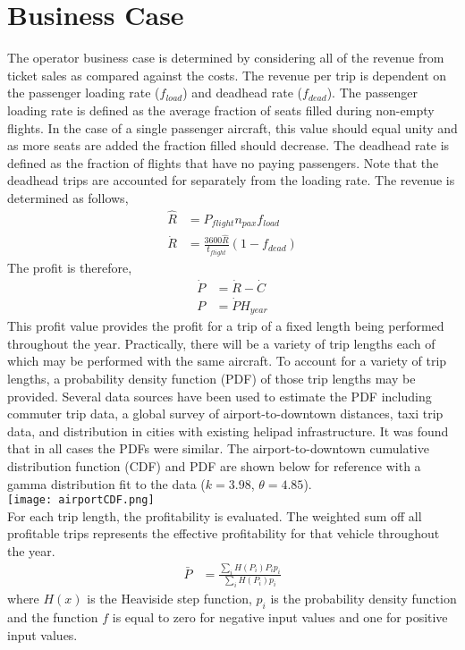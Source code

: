 \documentclass[12pt, letter]{article}
\begin{document}
\section{Business Case}
The operator business case is determined by considering all of the revenue from ticket sales as compared against the costs. The revenue per trip is dependent on the passenger loading rate ($f_{load}$) and deadhead rate ($f_{dead}$). The passenger loading rate is defined as the average fraction of seats filled during non-empty flights. In the case of a single passenger aircraft, this value should equal unity and as more seats are added the fraction filled should decrease. The deadhead rate is defined as the fraction of flights that have no paying passengers. Note that the deadhead trips are accounted for separately from the loading rate. The revenue is determined as follows,
\begin{align}
	\hat{R} &= P_{flight} n_{pax} f_{load} \\
	\dot{R} &= \frac{3600\hat{R}}{t_{flight}} \left(1-f_{dead}\right)
\end{align}
The profit is therefore,
\begin{align}
	\dot{P} &= \dot{R} - \dot{C}  \\
	P &= \dot{P} H_{year}
\end{align}
This profit value provides the profit for a trip of a fixed length being performed throughout the year. Practically, there will be a variety of trip lengths each of which may be performed with the same aircraft. To account for a variety of trip lengths, a probability density function (PDF) of those trip lengths may be provided. Several data sources have been used to estimate the PDF including commuter trip data, a global survey of airport-to-downtown distances, taxi trip data, and distribution in cities with existing helipad infrastructure. It was found that in all cases the PDFs were similar. The airport-to-downtown cumulative distribution function (CDF) and PDF are shown below for reference with a gamma distribution fit to the data ($k=3.98$, $\theta=4.85$).
\\\texttt{[image: airportCDF.png]}\\
For each trip length, the profitability is evaluated. The weighted sum off all profitable trips represents the effective profitability for that vehicle throughout the year.
\begin{align}
	\bar{P} &= \frac{\sum_i H(P_i) P_i p_i}{\sum_i H(P_i) p_i}
\end{align}
where $H(x)$ is the Heaviside step function, $p_i$ is the probability density function and the function $f$ is equal to zero for negative input values and one for positive input values.  
\end{document}
